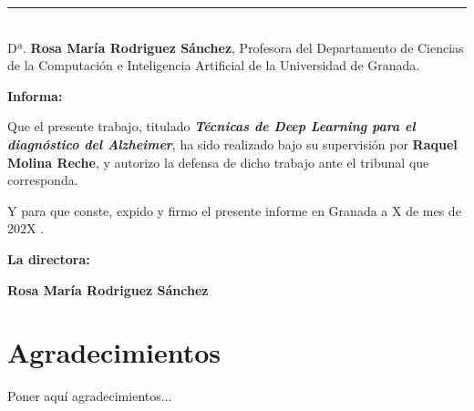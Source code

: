 \cleardoublepage
\thispagestyle{empty}

\noindent\rule[-1ex]{\textwidth}{2pt}\\[4.5ex]

Dª. \textbf{Rosa María Rodriguez Sánchez}, Profesora del Departamento de Ciencias de la Computación e Inteligencia Artificial de la Universidad de Granada.

\vspace{0.5cm}

\textbf{Informa:}

\vspace{0.5cm}

Que el presente trabajo, titulado \textit{\textbf{Técnicas de Deep Learning para el diagnóstico del Alzheimer}},
ha sido realizado bajo su supervisión por \textbf{Raquel Molina Reche}, y autorizo la defensa de dicho trabajo ante el tribunal
que corresponda.

\vspace{0.5cm}

Y para que conste, expido y firmo el presente informe en Granada a X de mes de 202X .

\vspace{1cm}

\textbf{La directora:}

\vspace{5cm}

\noindent \textbf{Rosa María Rodriguez Sánchez}

\chapter*{Agradecimientos}
\thispagestyle{empty}

       \vspace{1cm}


Poner aquí agradecimientos...

